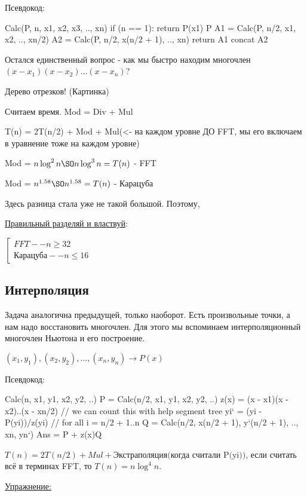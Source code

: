 Псевдокод:
\begin{cppcode}
Calc(P, n, x1, x2, x3, .., xn) {
	if (n == 1): return P(x1)
	P %
	A1 = Calc(P, n/2, x1, x2, .., xn/2)
	A2 = Calc(P, n/2, x(n/2 + 1), .., xn)
	return A1 concat A2
}
\end{cppcode}	

Остался единственный вопрос - как мы быстро находим многочлен $(x - x_1)(x - x_2)\dots(x - x_n)$?

Дерево отрезков! (Картинка) 

Считаем время. Mod = Div + Mul

T(n) = 2T(n/2) + Mod + Mul(<- на каждом уровне ДО FFT, мы его включаем в уравнение тоже на каждом уровне)

Mod = $n \log^2 n \SO n \log^3 n = T(n)$ - FFT

Mod = $n^{1.58} \SO n^{1.58} = T(n)$ - Карацуба

Здесь разница стала уже не такой большой. Поэтому, 

\underline{Правильный разделяй и властвуй}:

$\left[
	\begin{gathered}
	FFT -- n \ge 32 \\
	\text{Карацуба} -- n \le 16
	\end{gathered}
\right.$

\subsection{Интерполяция}
Задача аналогична предыдущей, только наоборот. Есть произвольные точки, а нам надо восстановить многочлен. Для этого мы вспоминаем интерполяционный многочлен Ньютона и его построение.

$(x_1, y_1), (x_2, y_2), \dots, (x_n, y_n) \rightarrow P(x)$

Псевдокод:

\begin{cppcode}
Calc(n, x1, y1, x2, y2, ..)
	P = Calc(n/2, x1, y1, x2, y2, ..)
	z(x) = (x - x1)(x - x2)..(x - xn/2) // we can count this with help segment tree
	yi` = (yi - P(yi))/z(yi) // for all i = n/2 + 1..n
	Q = Calc(n/2, x(n/2 + 1), y`(n/2 + 1), .., xn, yn`)
	Ans = P + z(x)Q
\end{cppcode}

$T(n) = 2T(n/2) + Mul + \text{Экстраполяция(когда считали P(yi))}$, если считать всё в терминах FFT, то $T(n) = n \log^4 n$.

\underline{Упражнение:}


